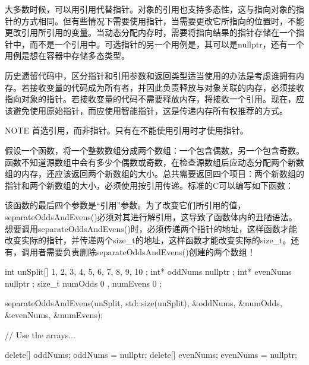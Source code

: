 大多数时候，可以用引用代替指针。对象的引用也支持多态性，这与指向对象的指针的方式相同。但有些情况下需要使用指针，当需要更改它所指向的位置时，不能更改引用所引用的变量。当动态分配内存时，需要将指向结果的指针存储在一个指针中，而不是一个引用中。可选指针的另一个用例是，其可以是nullptr，还有一个用例是想在容器中存储多态类型。

历史遗留代码中，区分指针和引用参数和返回类型适当使用的办法是考虑谁拥有内存。若接收变量的代码成为所有者，并因此负责释放与对象关联的内存，必须接收指向对象的指针。若接收变量的代码不需要释放内存，将接收一个引用。现在，应该避免使用原始指针，而应使用智能指针，这是传递内存所有权推荐的方式。

\begin{myNotic}{NOTE}
首选引用，而非指针。只有在不能使用引用时才使用指针。
\end{myNotic}

假设一个函数，将一个整数数组分成两个数组：一个包含偶数，另一个包含奇数。函数不知道源数组中会有多少个偶数或奇数，在检查源数组后应动态分配两个新数组的内存，还应该返回两个新数组的大小。总共需要返回四个项目：两个新数组的指针和两个新数组的大小，必须使用按引用传递。标准的C可以编写如下函数：


该函数的最后四个参数是“引用”参数。为了改变它们所引用的值，separateOddsAndEvens()必须对其进行解引用，这导致了函数体内的丑陋语法。想要调用separateOddsAndEvens()时，必须传递两个指针的地址，这样函数才能改变实际的指针，并传递两个size\_t的地址，这样函数才能改变实际的size\_t。还有，调用者需要负责删除separateOddsAndEvens()创建的两个数组！

\begin{cpp}
int unSplit[] { 1, 2, 3, 4, 5, 6, 7, 8, 9, 10 };
int* oddNums { nullptr };
int* evenNums { nullptr };
size_t numOdds { 0 }, numEvens { 0 };

separateOddsAndEvens(unSplit, std::size(unSplit),
    &oddNums, &numOdds, &evenNums, &numEvens);

// Use the arrays...

delete[] oddNums; oddNums = nullptr;
delete[] evenNums; evenNums = nullptr;
\end{cpp}

